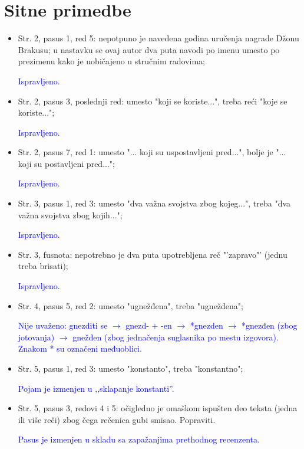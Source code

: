 \documentclass[a4paper]{report}
\newcommand{\odgovor}[1]{\textcolor{blue}{#1}}
\begin{document}
\section{Sitne primedbe}
\begin{itemize}
	\item Str. 2, pasus 1, red 5: nepotpuno je navedena godina uručenja nagrade Džonu Brakusu; u nastavku se ovaj autor dva puta navodi po imenu umesto po prezimenu kako je uobičajeno u stručnim radovima;
	
	\odgovor{Ispravljeno.}
	
	\item Str. 2, pasus 3, poslednji red: umesto "koji se koriste...", treba reći "koje se koriste...";
	
	\odgovor{Ispravljeno.}
	
	\item Str. 2, pasus 7, red 1: umesto "... koji su uspostavljeni pred...", bolje je "... koji su postavljeni pred..."; 
	
	\odgovor{Ispravljeno.}
	
	\item Str. 3, pasus 1, red 3: umesto "dva važna svojstva zbog kojeg...", treba "dva važna svojstva zbog kojih...";
	
	\odgovor{Ispravljeno.}
	
	\item Str. 3, fusnota: nepotrebno je dva puta upotrebljena reč "'zapravo"' (jednu treba brisati);
	
	\odgovor{Ispravljeno.}
	
	\item Str. 4, pasus 5, red 2: umesto "ugnežđena", treba "ugneždena";
	
	\odgovor{Nije uvaženo: gnezditi se $\rightarrow$ gnezd- + -en $\rightarrow$ *gnezden $\rightarrow$ *gnezđen (zbog jotovanja) $\rightarrow$ gnežđen (zbog jednačenja suglasnika po mestu izgovora). Znakom * su označeni međuoblici.}
	
	\item Str. 5, pasus 1, red 3: umesto "konstanto", treba "konstantno";
	
	\odgovor{Pojam je izmenjen u ‚‚sklapanje konstanti''.}
	
	\item Str. 5, pasus 3, redovi 4 i 5: očigledno je omaškom ispušten deo teksta (jedna ili više reči) zbog čega rečenica gubi smisao. Popraviti.

	\odgovor{Pasus je izmenjen u skladu sa zapažanjima prethodnog recenzenta.}
	

\end{itemize}
\end{document}
